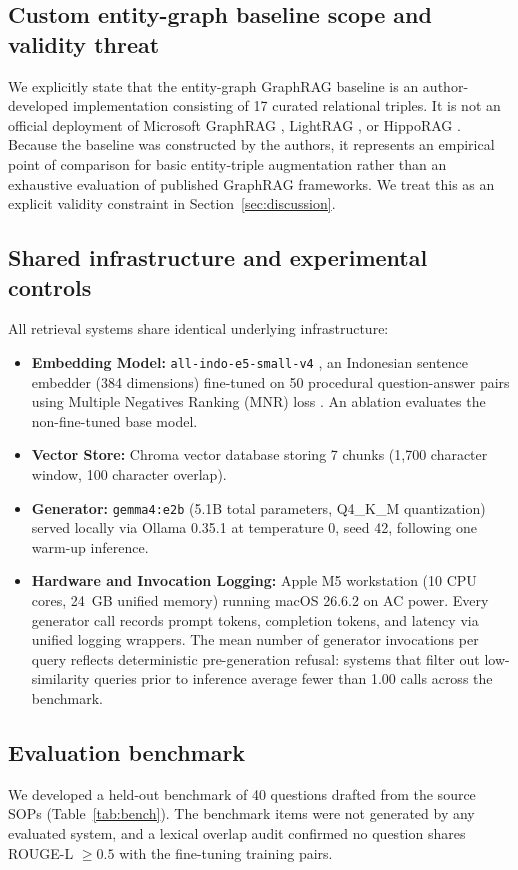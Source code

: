 \documentclass[preprint,10pt]{elsarticle}
\begin{document}
\subsection{Custom entity-graph baseline scope and validity threat}
We explicitly state that the entity-graph GraphRAG baseline is an author-developed implementation consisting of 17 curated relational triples. It is not an official deployment of Microsoft GraphRAG \cite{edge2024graphrag}, LightRAG \cite{guo2024lightrag}, or HippoRAG \cite{gutierrez2024hipporag}. Because the baseline was constructed by the authors, it represents an empirical point of comparison for basic entity-triple augmentation rather than an exhaustive evaluation of published GraphRAG frameworks. We treat this as an explicit validity constraint in Section~\ref{sec:discussion}.

\subsection{Shared infrastructure and experimental controls}
All retrieval systems share identical underlying infrastructure:
\begin{itemize}[leftmargin=*]
\item \textbf{Embedding Model:} \texttt{all-indo-e5-small-v4} \cite{lazarusnlp_e5}, an Indonesian sentence embedder (384 dimensions) fine-tuned on 50 procedural question-answer pairs using Multiple Negatives Ranking (MNR) loss \cite{henderson2017mnr}. An ablation evaluates the non-fine-tuned base model.
\item \textbf{Vector Store:} Chroma vector database storing 7 chunks (1,700 character window, 100 character overlap).
\item \textbf{Generator:} \texttt{gemma4:e2b} (5.1B total parameters, Q4\_K\_M quantization) served locally via Ollama 0.35.1 at temperature 0, seed 42, following one warm-up inference.
\item \textbf{Hardware and Invocation Logging:} Apple M5 workstation (10 CPU cores, 24~GB unified memory) running macOS 26.6.2 on AC power. Every generator call records prompt tokens, completion tokens, and latency via unified logging wrappers. The mean number of generator invocations per query reflects deterministic pre-generation refusal: systems that filter out low-similarity queries prior to inference average fewer than 1.00 calls across the benchmark.
\end{itemize}

\subsection{Evaluation benchmark}
We developed a held-out benchmark of 40 questions drafted from the source SOPs (Table~\ref{tab:bench}). The benchmark items were not generated by any evaluated system, and a lexical overlap audit confirmed no question shares ROUGE-L $\geq 0.5$ with the fine-tuning training pairs.
\end{document}
